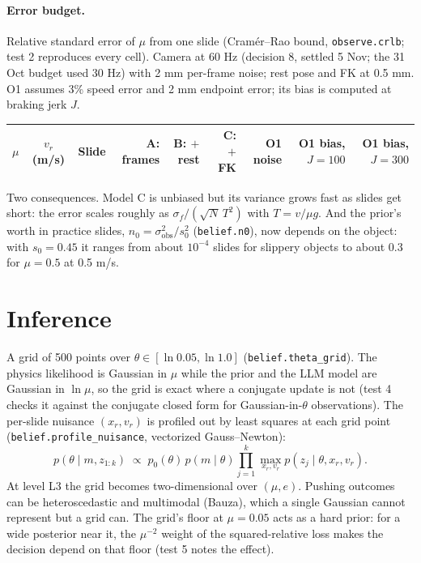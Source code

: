 \documentclass[10pt]{article}
\newcommand{\code}[1]{\texttt{#1}}
\begin{document}
\paragraph{Error budget.}  Relative standard error of $\mu$ from one slide (Cram\'er--Rao bound,
\code{observe.crlb}; test 2 reproduces every cell).  Camera at 60 Hz (decision 8, settled 5 Nov; the 31 Oct budget used 30 Hz) with 2 mm per-frame noise; rest pose and FK
at 0.5 mm.  O1 assumes 3\% speed error and 2 mm endpoint error; its bias is computed at braking jerk $J$.
\begin{center}\small
\begin{tabular}{@{}cclrrrrrr@{}}
\toprule
$\mu$ & $v_r$ (m/s) & Slide & A: frames & B: $+$rest & C: $+$FK & O1 noise & O1 bias, $J{=}100$ & O1 bias, $J{=}300$\\
\midrule

\bottomrule
\end{tabular}
\end{center}
Two consequences.  Model C is unbiased but its variance grows fast as slides get short: the error scales roughly
as $\sigma_f/(\sqrt N\,T^{2})$ with $T=v/\mu g$.  And the prior's worth in practice slides,
$n_0=\sigma_{\text{obs}}^{2}/s_0^{2}$ (\code{belief.n0}), now depends on the object: with $s_0=0.45$ it ranges from
about $10^{-4}$ slides for slippery objects to about 0.3 for $\mu=0.5$ at 0.5 m/s.

\section{Inference}
\label{sec:inference}
A grid of 500 points over $\theta\in[\ln0.05,\ln1.0]$ (\code{belief.theta\_grid}).  The physics likelihood is
Gaussian in $\mu$ while the prior and the LLM model are Gaussian in $\ln\mu$, so the grid is exact where a conjugate
update is not (test 4 checks it against the conjugate closed form for Gaussian-in-$\theta$ observations).  The
per-slide nuisance $(x_r,v_r)$ is profiled out by least squares at each grid point
(\code{belief.profile\_nuisance}, vectorized Gauss--Newton):
\begin{equation}
p(\theta\mid m,z_{1:k})\;\propto\;p_0(\theta)\,p(m\mid\theta)\prod_{j=1}^{k}\max_{x_r,v_r}p(z_j\mid\theta,x_r,v_r).
\end{equation}
At level L3 the grid becomes two-dimensional over $(\mu,e)$.  Pushing outcomes can be heteroscedastic and
multimodal (Bauza), which a single Gaussian cannot represent but a grid can.  The grid's floor at $\mu=0.05$ acts as a
hard prior: for a wide posterior near it, the $\mu^{-2}$ weight of the squared-relative loss makes the decision
depend on that floor (test 5 notes the effect).
\end{document}

